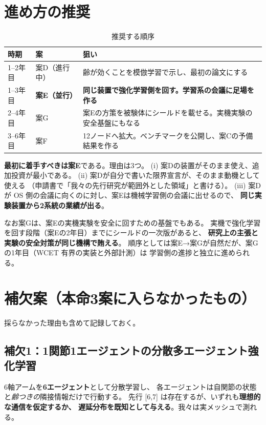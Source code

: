 \documentclass[11pt,a4paper]{article}
\newcommand{\prob}[1]{\textbf{\textcolor{red!55!black}{#1}}}
\newcommand{\keyp}[1]{\textbf{\textcolor{blue!45!black}{#1}}}
\begin{document}
\section{進め方の推奨}

\begin{table}[htbp]
\centering
\small
\caption{推奨する順序}
\begin{tabularx}{\textwidth}{@{}l l X@{}}
\toprule
\textbf{時期} & \textbf{案} & \textbf{狙い} \\
\midrule
1--2年目 & 案D（進行中） & 齢が効くことを模倣学習で示し、最初の論文にする \\
1--3年目 & \textbf{案E（並行）} & \textbf{同じ装置で強化学習側を回す。学習系の会議に足場を作る} \\
2--4年目 & 案G & 案Eの方策を被験体にシールドを載せる。実機実験の安全基盤にもなる \\
3--6年目 & 案F & 12ノードへ拡大。ベンチマークを公開し、案Cの予備結果を作る \\
\bottomrule
\end{tabularx}
\end{table}

\noindent
\keyp{最初に着手すべきは案E}である。理由は3つ。
(i) 案Dの装置がそのまま使え、追加投資が最小である。
(ii) 案Dが自分で書いた限界宣言が、そのまま動機として使える
（申請書で「我々の先行研究が範囲外とした領域」と書ける）。
(iii) 案Dが OS 側の会議に向くのに対し、案Eは機械学習側の会議に出せるので、
\keyp{同じ実験装置から2系統の業績が出る}。

\medskip
\noindent
なお案Gは、案Eの実機実験を安全に回すための基盤でもある。
実機で強化学習を回す段階（案Eの2年目）までにシールドの一次版があると、
\keyp{研究上の主張と実験の安全対策が同じ機構で賄える}。
順序としては案E→案Gが自然だが、案Gの1年目（WCET 有界の実装と外部計測）は
学習側の進捗と独立に進められる。

\section{補欠案（本命3案に入らなかったもの）}

採らなかった理由も含めて記録しておく。

\subsection*{補欠1：1関節1エージェントの分散多エージェント強化学習}

6軸アームを\keyp{6エージェント}として分散学習し、
各エージェントは自関節の状態と\emph{齢つきの}隣接情報だけで行動する。
先行 [6,7] は存在するが、いずれも\prob{理想的な通信を仮定するか、
遅延分布を既知として与える}。我々は実メッシュで測れる。
\end{document}

